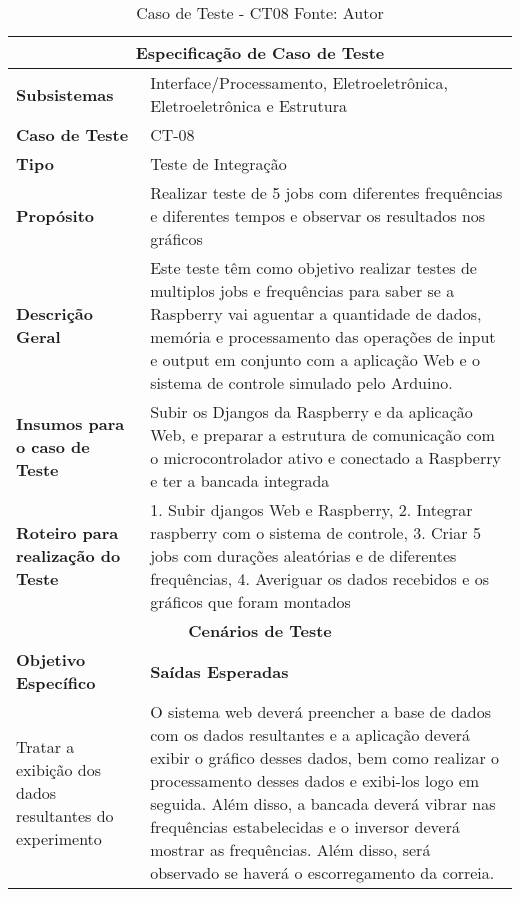 \begin{table}[H]
    \begin{center}
        \begin{tabular}{|p{5cm}|p{12cm}|}
            \hline
            \multicolumn{2}{|c|}{\textbf{Especificação de Caso de Teste}} \\ \hline
                \textbf{Subsistemas}                               &  Interface/Processamento, Eletroeletrônica, Eletroeletrônica e Estrutura \\ \hline
                \textbf{Caso de Teste}                             & CT-08 \\ \hline
                \textbf{Tipo}                                             & Teste de Integração \\ \hline
                \textbf{Propósito}                                     & Realizar teste de 5 jobs com diferentes frequências e diferentes tempos e observar os resultados nos gráficos \\ \hline
                \textbf{Descrição Geral}                           & Este teste têm como objetivo realizar testes de multiplos jobs e frequências para saber se a Raspberry vai aguentar a quantidade de dados, memória e processamento das operações de input  e output em conjunto com a aplicação Web e o sistema de controle simulado pelo Arduino. \\ \hline
                \textbf{Insumos para o caso de Teste}    & Subir os Djangos da Raspberry e da aplicação Web, e preparar a estrutura de comunicação com o microcontrolador ativo e conectado a Raspberry e ter a bancada integrada\\ \hline
                \textbf{Roteiro para realização do Teste}&  1. Subir djangos Web e Raspberry, 2. Integrar raspberry com o sistema de controle, 3. Criar 5 jobs com durações aleatórias e de diferentes frequências, 4. Averiguar os dados recebidos e os gráficos que foram montados  \\ \hline
            \multicolumn{2}{|c|}{\textbf{Cenários de Teste}} \\ \hline
                \textbf{Objetivo Específico}                      & \textbf{Saídas Esperadas} \\ \hline
                Tratar a exibição dos dados resultantes do experimento & O sistema web deverá preencher a base de dados com os dados resultantes e a aplicação deverá exibir o gráfico desses dados, bem como realizar o processamento desses dados e exibi-los logo em seguida.  Além disso, a bancada deverá vibrar nas frequências estabelecidas e o inversor deverá mostrar as frequências. Além disso, será observado se haverá o escorregamento da correia. \\ \hline
        \end{tabular}
    \end{center}
    \caption[Caso de Teste - CT08]{Caso de Teste - CT08
    \protect Fonte: Autor}
    \label{CT-08}
\end{table}


